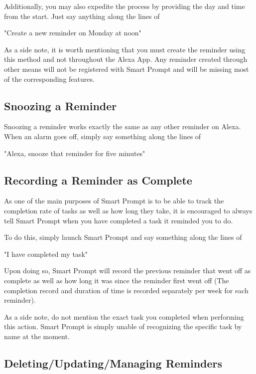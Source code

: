 \documentclass[11pt, oneside]{article}
\begin{document}
Additionally, you may also expedite the process by providing the day and time from the start. Just say anything along the lines of
\begin{center}
"Create a new reminder on Monday at noon"
\end{center}
As a side note, it is worth mentioning that you must create the reminder using this method and not throughout the Alexa App. Any reminder created through other means will not be registered with Smart Prompt and will be missing most of the corresponding features.

\subsection{Snoozing a Reminder}

Snoozing a reminder works exactly the same as any other reminder on Alexa. When an alarm goes off, simply say something along the lines of
\begin{center}
"Alexa, snooze that reminder for five minutes"
\end{center}

\subsection{Recording a Reminder as Complete}

As one of the main purposes of Smart Prompt is to be able to track the completion rate of tasks as well as how long they take, it is encouraged to always tell Smart Prompt when you have completed a task it reminded you to do.

To do this, simply launch Smart Prompt and say something along the lines of
\begin{center}
"I have completed my task"
\end{center}
Upon doing so, Smart Prompt will record the previous reminder that went off as complete as well as how long it was since the reminder first went off (The completion record and duration of time is recorded separately per week for each reminder).

As a side note, do not mention the exact task you completed when performing this action. Smart Prompt is simply unable of recognizing the specific task by name at the moment.

\subsection{Deleting/Updating/Managing Reminders}
\end{document}
